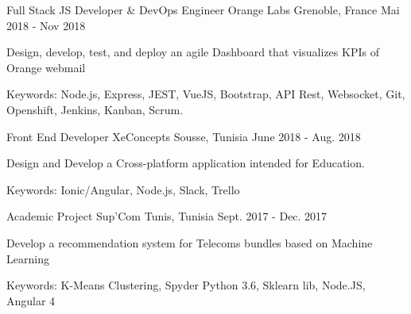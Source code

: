 

\begin{cventries}

  \cventry
    {Full Stack JS Developer \& DevOps Engineer} %
    {Orange Labs} %
    {Grenoble, France} %
    {Mai 2018 - Nov 2018} %
    {
      \begin{cvitems} %
        \item {Design, develop, test, and deploy an agile Dashboard that visualizes KPIs of Orange webmail}
        \item {Keywords: Node.js, Express, JEST, VueJS, Bootstrap, API Rest, Websocket, Git, Openshift, Jenkins, Kanban, Scrum.}
      \end{cvitems}
    }

  \cventry
    {Front End Developer} %
    {XeConcepts} %
    {Sousse, Tunisia} %
    {June 2018 - Aug. 2018} %
    {
      \begin{cvitems} %
        \item {Design and Develop a Cross-platform application intended for Education.}
        \item {Keywords: Ionic/Angular, Node.js, Slack, Trello}
      \end{cvitems}
    }

  \cventry
    {Academic Project} %
    {Sup'Com} %
    {Tunis, Tunisia} %
    {Sept. 2017 - Dec. 2017} %
    {
      \begin{cvitems} %
        \item {Develop a recommendation system for Telecoms bundles based on Machine Learning }
        \item {Keywords: K-Means Clustering, Spyder Python 3.6, Sklearn lib, Node.JS, Angular 4}
      \end{cvitems}
    }


\end{cventries}
